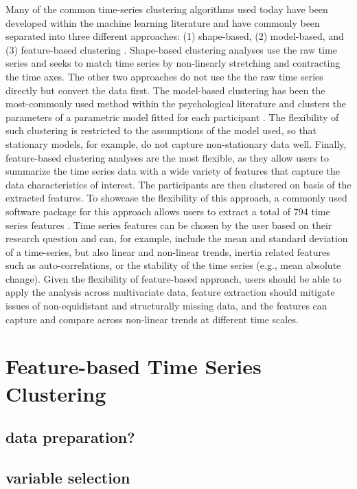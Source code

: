 \documentclass[man, 12pt, a4paper]{apa7}
\theoremstyle{break}
\theoremstyle{plain}
\begin{document}
Many of the common time-series clustering algorithms used today have been developed within the machine learning literature and have commonly been separated into three different approaches: (1) shape-based, (2) model-based, and (3) feature-based clustering \citep{hautamaki2008, liao2005}. Shape-based clustering analyses use the raw time series and seeks to match time series by non-linearly stretching and contracting the time axes. The other two approaches do not use the the raw time series directly but convert the data first. The model-based clustering has been the most-commonly used method within the psychological literature and clusters the parameters of a parametric model fitted for each participant \citep[e.g.,][]{ernst2021}. The flexibility of such clustering is restricted to the assumptions of the model used, so that stationary models, for example, do not capture non-stationary data well. Finally, feature-based clustering analyses are the most flexible, as they allow users to summarize the time series data with a wide variety of features that capture the data characteristics of interest. The participants are then clustered on basis of the extracted features. To showcase the flexibility of this approach, a commonly used software package for this approach allows users to extract a total of 794 time series features \citep[][]{christ2018}. Time series features can be chosen by the user based on their research question and can, for example, include the mean and standard deviation of a time-series, but also linear and non-linear trends, inertia related features such as auto-correlations, or the stability of the time series (e.g., mean absolute change). Given the flexibility of feature-based approach, users should be able to apply the analysis across multivariate data, feature extraction should mitigate issues of non-equidistant and structurally missing data, and the features can capture and compare across non-linear trends at different time scales.

\section{Feature-based Time Series Clustering}

\subsection{data preparation?}

\subsection{variable selection}
\end{document}
